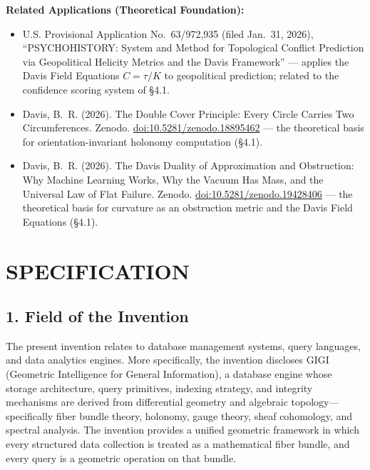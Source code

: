 \documentclass[11pt,letterpaper]{article}
\begin{document}
\textbf{Related Applications (Theoretical Foundation):}
\begin{itemize}[nosep]
  \item U.S. Provisional Application No.~63/972,935 (filed Jan.~31, 2026), ``PSYCHOHISTORY: System and Method for Topological Conflict Prediction via Geopolitical Helicity Metrics and the Davis Framework'' --- applies the Davis Field Equations $C = \tau/K$ to geopolitical prediction; related to the confidence scoring system of \S4.1.
  \item Davis, B.~R. (2026). The Double Cover Principle: Every Circle Carries Two Circumferences. Zenodo. \href{https://doi.org/10.5281/zenodo.18895462}{doi:10.5281/zenodo.18895462} --- the theoretical basis for orientation-invariant holonomy computation (\S4.1).
  \item Davis, B.~R. (2026). The Davis Duality of Approximation and Obstruction: Why Machine Learning Works, Why the Vacuum Has Mass, and the Universal Law of Flat Failure. Zenodo. \href{https://doi.org/10.5281/zenodo.19428406}{doi:10.5281/zenodo.19428406} --- the theoretical basis for curvature as an obstruction metric and the Davis Field Equations (\S4.1).
\end{itemize}


\newpage
\section*{SPECIFICATION}


\subsection*{1. Field of the Invention}

The present invention relates to database management systems, query languages, and data analytics engines. More specifically, the invention discloses GIGI (Geometric Intelligence for General Information), a database engine whose storage architecture, query primitives, indexing strategy, and integrity mechanisms are derived from differential geometry and algebraic topology---specifically fiber bundle theory, holonomy, gauge theory, sheaf cohomology, and spectral analysis. The invention provides a unified geometric framework in which every structured data collection is treated as a mathematical fiber bundle, and every query is a geometric operation on that bundle.
\end{document}
